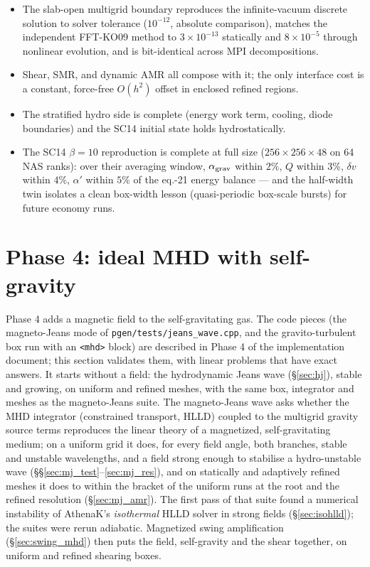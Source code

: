 \documentclass[11pt]{article}
\newcommand{\code}[1]{\texttt{#1}}
\newcommand{\file}[1]{\texttt{#1}}
\begin{document}
\begin{itemize}\itemsep2pt
\item The slab-open multigrid boundary reproduces the infinite-vacuum discrete
      solution to solver tolerance ($10^{-12}$, absolute comparison), matches the
      independent FFT-KO09 method to $3\times10^{-13}$ statically and
      $8\times10^{-5}$ through nonlinear evolution, and is bit-identical across
      MPI decompositions.
\item Shear, SMR, and dynamic AMR all compose with it; the only interface cost is
      a constant, force-free $O(h^2)$ offset in enclosed refined regions.
\item The stratified hydro side is complete (energy work term, cooling, diode
      boundaries) and the SC14 initial state holds hydrostatically.
\item The SC14 $\beta = 10$ reproduction is complete at full size
      ($256\times256\times48$ on 64 NAS ranks): over their averaging window,
      $\alpha_{\rm grav}$ within $2\%$, $Q$ within $3\%$, $\delta v$ within
      $4\%$, $\alpha'$ within $5\%$ of the eq.-21 energy balance --- and the
      half-width twin isolates a clean box-width lesson (quasi-periodic
      box-scale bursts) for future economy runs.
\end{itemize}

\section{Phase 4: ideal MHD with self-gravity}
\label{sec:phase4}

Phase 4 adds a magnetic field to the self-gravitating gas. The code pieces (the
magneto-Jeans mode of \file{pgen/tests/jeans\_wave.cpp}, and the gravito-turbulent box run
with an \code{<mhd>} block) are described in Phase 4 of the implementation document; this
section validates them, with linear problems that have exact answers. It starts without a
field: the hydrodynamic Jeans wave (\S\ref{sec:hj}), stable and growing, on uniform and refined
meshes, with the same box, integrator and meshes as the magneto-Jeans suite. The magneto-Jeans
wave asks whether the MHD integrator (constrained transport, HLLD) coupled to the multigrid
gravity source terms reproduces the linear theory of a magnetized, self-gravitating medium;
on a uniform grid it does, for every field angle, both branches, stable and unstable
wavelengths, and a field strong enough to stabilise a hydro-unstable wave
(\S\S\ref{sec:mj_test}--\ref{sec:mj_res}), and on statically and adaptively refined meshes it
does to within the bracket of the uniform runs at the root and the refined resolution
(\S\ref{sec:mj_amr}). The first pass of that suite found a numerical instability of AthenaK's
\emph{isothermal} HLLD solver in strong fields (\S\ref{sec:isohlld}); the suites were rerun
adiabatic. Magnetized swing amplification (\S\ref{sec:swing_mhd}) then puts the field,
self-gravity and the shear together, on uniform and refined shearing boxes.
\end{document}
